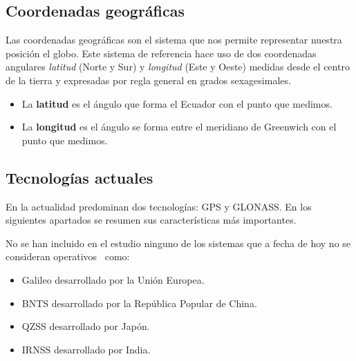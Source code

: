 \subsection{Coordenadas geográficas}
\label{sec:coordenadas}

Las coordenadas geográficas son el sistema que nos permite representar nuestra posición el
globo. Este sistema de referencia hace uso de dos coordenadas angulares \emph{latitud} (Norte y Sur)
y \emph{longitud} (Este y Oeste) medidas desde el centro de la tierra y expresadas por regla general
en grados sexagesimales.

\begin{itemize}
  \item La \textbf{latitud} es el ángulo que forma el Ecuador con el punto que medimos.
  \item La \textbf{longitud} es el ángulo se forma entre el meridiano de Greenwich con el punto que
    medimos.
\end{itemize}

\subsection{Tecnologías actuales}
\label{sec:tecnologiasActuales}

En la actualidad predominan dos tecnologías: \acf{GPS} y \acf{GLONASS}. En los siguientes apartados
se resumen sus características más importantes.

No se han incluido en el estudio ninguno de los sistemas que a fecha de hoy no se consideran
operativos~\cite{SPSA} como:

\begin{itemize}
  \item Galileo desarrollado por la Unión Europea.
  \item \acf{BNTS} desarrollado por la República Popular de China.
  \item \acf{QZSS} desarrollado por Japón.
  \item \acf{IRNSS} desarrollado por India.
\end{itemize}


